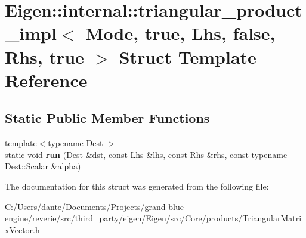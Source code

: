\hypertarget{struct_eigen_1_1internal_1_1triangular__product__impl_3_01_mode_00_01true_00_01_lhs_00_01false_00_01_rhs_00_01true_01_4}{}\section{Eigen\+::internal\+::triangular\+\_\+product\+\_\+impl$<$ Mode, true, Lhs, false, Rhs, true $>$ Struct Template Reference}
\label{struct_eigen_1_1internal_1_1triangular__product__impl_3_01_mode_00_01true_00_01_lhs_00_01false_00_01_rhs_00_01true_01_4}
\subsection*{Static Public Member Functions}
\begin{DoxyCompactItemize}
\item 
\mbox{\label{struct_eigen_1_1internal_1_1triangular__product__impl_3_01_mode_00_01true_00_01_lhs_00_01false_00_01_rhs_00_01true_01_4_ad9ba4ee44cda8a75940959ff40a055b8}} 
{\footnotesize template$<$typename Dest $>$ }\\static void {\bfseries run} (Dest \&dst, const Lhs \&lhs, const Rhs \&rhs, const typename Dest\+::\+Scalar \&alpha)
\end{DoxyCompactItemize}


The documentation for this struct was generated from the following file\+:\begin{DoxyCompactItemize}
\item 
C\+:/\+Users/dante/\+Documents/\+Projects/grand-\/blue-\/engine/reverie/src/third\+\_\+party/eigen/\+Eigen/src/\+Core/products/Triangular\+Matrix\+Vector.\+h\end{DoxyCompactItemize}
